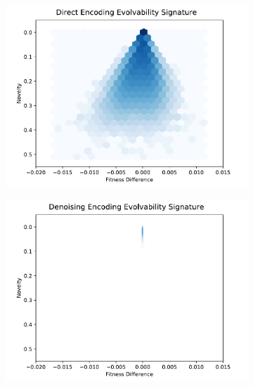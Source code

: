 \begin{figure}
  \begin{subfigure}[b]{0.33\linewidth}
    \includegraphics[width=\linewidth]{img/results/direct_es_unscaled}
    \label{fig:table_direct_es}
  \end{subfigure}
  \begin{subfigure}[b]{0.33\linewidth}
    \includegraphics[width=\linewidth]{img/results/noise_es_unscaled}
    \label{fig:table_noise_es}
  \end{subfigure}
  \begin{subfigure}[b]{0.33\linewidth}

\end{subfigure}
\end{figure}
